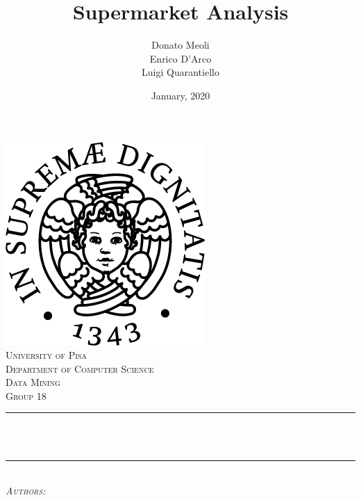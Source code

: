 \documentclass[10pt]{article}
\title{Supermarket Analysis}
\author{Donato Meoli \\ Enrico D'Arco \\ Luigi Quarantiello}
\date{January, 2020}
\makeatletter
\let\thetitle\@title
\let\theauthor\@author
\let\thedate\@date
\makeatother
\begin{document}
\begin{titlepage}
	\centering
    \vspace*{0.5 cm}
    \includegraphics[scale = 0.5]{img/unipi.png}\\[1.0 cm]
    \textsc{\LARGE University of Pisa}\\[0.5 cm]
    \textsc{\Large Department of Computer Science}\\[1.5 cm]
	\textsc{\large Data Mining \\ Group 18}\\[0.5 cm]
	\rule{\linewidth}{0.2 mm} \\[0.4 cm]
	{ \huge \bfseries \thetitle}\\
	\rule{\linewidth}{0.2 mm} \\[1.5 cm]
	\centering \textsc{\large \emph{Authors:}}\\[0.5 cm]
	\begin{minipage}{0.4\textwidth}
		\begin{center} \large
			\textbf{\theauthor}
		\end{center}
		\end{minipage}~
		\begin{minipage}{0.4\textwidth}
	\end{minipage}\\[2 cm]
	{\large \thedate}\\[2 cm]
	\vfill
\end{titlepage}

\tableofcontents
\pagebreak


\pagebreak

\pagebreak

\clearpage

\pagebreak




\end{document}

